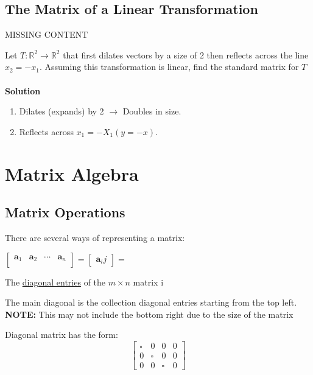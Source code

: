 \documentclass{report}
\begin{document}
\section{The Matrix of a Linear Transformation}
\begin{definition}
	MISSING CONTENT
\end{definition}
\begin{example}
Let $T:\mathbb{R}^2\rightarrow\mathbb{R}^2$ that first dilates vectors by a size of 2 then reflects across the line $x_2=-x_1$. Assuming this transformation is linear, find the standard matrix for $T$\\
\\
\textbf{Solution}
\begin{enumerate}
	\item Dilates (expands) by 2 $\rightarrow$ Doubles in size.
	\item Reflects across $x_1=-X_1 (y=-x)$.
\end{enumerate}
\end{example}

\chapter{Matrix Algebra}

\section{Matrix Operations}
There are several ways of representing a matrix:\\
\begin{center}
$\begin{bmatrix}
\mathbf{a}_1 & \mathbf{a}_2 & \dotsb & \mathbf{a}_n \\ 
\end{bmatrix}
=
\begin{bmatrix}
\mathbf{a}_ij
\end{bmatrix}
=
$
\end{center}
\begin{definition}
The \underline{diagonal entries} of the $m \times n$ matrix i
\end{definition}

\begin{definition}
The main diagonal is the collection diagonal entries starting from the top left. \textbf{NOTE:} This may not include the bottom right due to the size of the matrix
\end{definition}

\begin{definition}
Diagonal matrix has the form:
\begin{equation*}
	\begin{bmatrix}
	\square & 0 & 0 & 0 \\ 
	0 & \square & 0 & 0 \\ 
	0 & 0 & \square & 0
	\end{bmatrix}
\end{equation*}
\end{definition}
\end{document}
